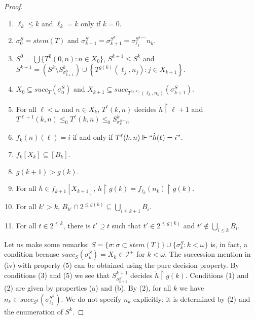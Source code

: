 \documentclass{amsart}
\theoremstyle{definition}
\theoremstyle{remark}
\numberwithin{equation}{section}
\newcommand{\id}{\mathcal{I}}
\begin{document}
\begin{proof}
\begin{enumerate}
    \item $\ell_k\leq k$ and $\ell_k=k$ only if $k=0$.
    \item $\sigma^S_0=stem(T)$ and $\sigma^S_{k+1}=\sigma^{S^k}_{k+1}={\sigma^{S^k}_{\ell_k}}^\frown n_k$.
    \item $S^0=\bigcup\{T^{0}(0,n):n\in X_0\}$, $S^{k+1}\leq S^{k}$ and  \\$S^{k+1}=\left(S^k\setminus S^k_{\sigma^S_{k+1}}\right)\cup \left\{T^{g(k)}(\ell_j,n_j):j\in X_{k+1}\right\}$.
    \item $X_0\subseteq succ_T(\sigma_0^S)$ and $X_{k+1}\subseteq succ_{T^{g(k)}(\ell_k,n_k)}(\sigma^S_{k+1})$.
    \item For all $\ell<\omega$ and $n\in X_k$, $T^{\ell}(k,n)$ decides $\dot h \upharpoonright \ell+1$ and
    \\$T^{\ell+1}(k,n)\leq_0 T^\ell(k,n)\leq_0 S^k_{{\sigma_k^S}^\frown n}$ 
    \item $f_k(n)(\ell)=i$ if and only if $T^\ell(k,n)\Vdash``\dot h(\ell)=i"$.
    \item $ f_k[X_k]\subseteq [B_k]$.
    \item $g(k+1)>g(k)$.
    \item For all $\bar h\in f_{k+1}[X_{k+1}]$, $\bar h\upharpoonright g(k)=f_{\ell_k}(n_k)\upharpoonright g(k)$.
    \item For all $k'>k, \,B_{k'}\cap 2^{\leq g(k)}\subseteq \bigcup_{i\leq k+1} B_i$.
    \item For all $t\in 2^{\leq k}$, there is $t'\supseteq t$ such that $t'\in 2^{\leq g(k)}$ and $ t'\notin \bigcup_{i\leq k}B_i$.
\end{enumerate}

Let us make some remarks: $S=\{\sigma: \sigma\subset  stem(T)\}\cup \{\sigma^S_{k}:k<\omega\}$ is, in fact, a condition because $succ_S(\sigma^S_k)=X_k\in\id^+$ for $k<\omega$. The succession mention in (iv) with property (5) can be obtained using the pure decision property. By conditions (3) and (5) we see that $S^{k+1}_{\sigma^{S}_{k+1}}$ decides $\dot h\upharpoonright g(k)$. Conditions (1) and (2) are given by properties (a) and (b). By (2), for all $k$ we have $n_k\in succ_{S^k}(\sigma^{S^k}_{\ell_k})$. We do not specify $n_k$ explicitly; it is determined by (2) and the enumeration of $S^k$.





\end{proof}
\end{document}
